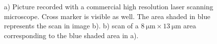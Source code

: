 		\begin{figure}[!htb]
			\begin{subfigure}{ 0.49\linewidth}
				\centering
				\caption{}
				\label{subfig::cross_laser_scan_1}
			\end{subfigure}
			\hfill
			\begin{subfigure}{ 0.49\linewidth}
				\centering
				\caption{}
				\label{subfig::pp_pl_scan_1}
			\end{subfigure}
				\caption[Combining \fl and LSM image to identify \nds]{a) Picture recorded with a commercial high resolution laser scanning microscope. Cross marker is visible as well. The area shaded in blue represents the \pl scan in image b). b) \Pl scan of a $\SI{8}{\micro\metre} \times  \SI{13}{\micro\metre}$ area corresponding to the blue shaded area in a).}
		\end{figure}


